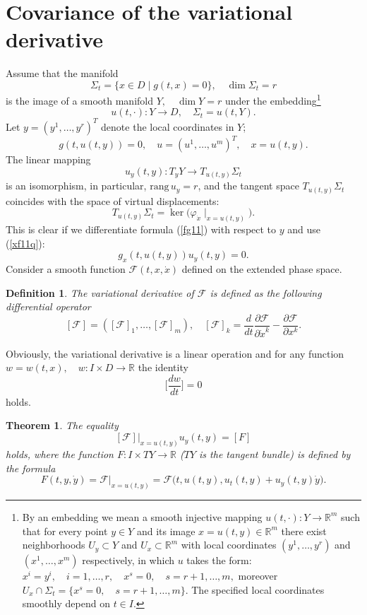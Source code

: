 \documentclass[reqno,12pt]{amsproc}
\newtheorem{theo}{Theorem}
\newtheorem{df}{Definition}
\newcommand\ph\varphi
\begin{document}
\section{Covariance of the variational derivative}
Assume that the manifold
$$\Sigma_t=\{x\in D\mid g(t,x)=0\},\quad \dim\Sigma_t=r$$ is the image of a smooth manifold $Y,\quad \dim Y=r$ under the embedding\footnote{By an embedding we mean a smooth injective mapping
$u(t,\cdot):Y\to\mathbb{R}^m$ such that for every point $y\in Y$ and its image $x=u(t,y)\in \mathbb{R}^m$ there exist neighborhoods $U_y\subset Y$ and $U_x\subset\mathbb{R}^m$ with local coordinates $(y^1,\ldots,y^r)$ and $(x^1,\ldots,x^m)$ respectively, in which $u$ takes the form: $x^i=y^i,\quad i=1,\ldots, r,\quad x^s=0,\quad s=r+1,\ldots,m,$ moreover $U_x\cap \Sigma_t=\{x^s=0,\quad s=r+1,\ldots,m\}.$
The specified local coordinates smoothly depend on $t\in I$.}
$$u(t,\cdot):Y\to D,\quad \Sigma_t=u(t,Y).$$
Let $y=(y^1,\ldots,y^r)^T$ denote the local coordinates in $Y$;
\begin{equation}\label{fg11}g(t,u(t,y))=0,\quad u=(u^1,\ldots,u^m)^T, \quad x=u(t,y).\end{equation}
The linear mapping
$$u_y(t,y):T_yY\to T_{u(t,y)}\Sigma_t$$ is an isomorphism, in particular,
$\mathrm{rang}\,u_y=r$,
and the tangent space
$T_{u(t,y)}\Sigma_t$ coincides with the space of virtual displacements:
$$T_{u(t,y)}\Sigma_t=\ker \big(\ph_{\dot x}\mid_{x=u(t,y)}\big).$$
This is clear if we differentiate formula (\ref{fg11}) with respect to $y$ and use (\ref{xf11q}):
$$g_x(t,u(t,y))u_y(t,y)=0.$$
Consider a smooth function $\mathscr{F}(t,x,\dot x)$ defined on the extended phase space.
\begin{df}
The variational derivative of $\mathscr{F}$ is defined as the following differential operator
$$[\mathscr{F}]=([\mathscr{F}]_{1},\ldots ,[\mathscr{F}]_{m}),\quad [\mathscr{F}]_{k}=\frac{d}{dt}\frac{\partial \mathscr{F}}{\partial\dot x^k}-\frac{\partial \mathscr{F}}{\partial x^k}.$$
\end{df}
Obviously, the variational derivative is a linear operation and
for any function $w=w(t,x),\quad w:I\times D\to \mathbb{R}$
the identity 
$$\Big[\frac{dw}{dt}\Big]=0$$
holds.



\begin{theo}\label{dfggg456}
The equality
$$[\mathscr{F}]\Big|_{x=u(t,y)}u_y(t,y)=[F]$$
holds, where the function $F:I\times TY\to\mathbb{R}$ ($TY$ is the tangent bundle) is defined by the formula
\begin{equation}\label{dff}F(t,y,\dot y)=\mathscr{F}\Big|_{x=u(t,y)}=\mathscr{F}\big(t,u(t,y),u_t(t,y)+u_y(t,y)\dot y\big).\end{equation}
\end{theo}
\end{document}
